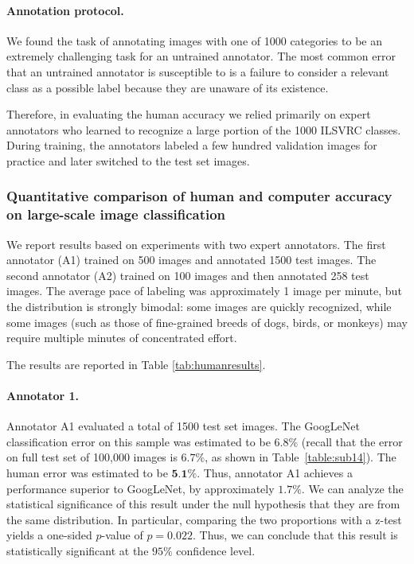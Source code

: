 \paragraph{Annotation protocol.} We found the task of annotating images with one of 1000 categories to be an extremely challenging task for an untrained annotator. The most common error that an untrained annotator is susceptible to is a failure to consider a relevant class as a possible label because they are unaware of its existence. 


Therefore, in evaluating the human accuracy we relied primarily on expert annotators who learned to recognize a large portion of the 1000 ILSVRC classes. During training, the annotators labeled a few hundred validation images for practice and later switched to the test set images.




\subsubsection{Quantitative comparison of human and computer accuracy on large-scale image classification}

We report results based on experiments with two expert annotators. The first annotator (A1) trained on 500 images and annotated 1500 test images. The second annotator (A2) trained on 100 images and then annotated 258 test images. The average pace of labeling was approximately 1 image per minute, but the distribution is strongly bimodal: some images are quickly recognized, while some images (such as those of fine-grained breeds of dogs, birds, or monkeys) may require multiple minutes of concentrated effort.

The results are reported in Table \ref{tab:humanresults}. 

\paragraph{Annotator 1.} Annotator A1 evaluated a total of 1500 test set images. The GoogLeNet classification error on this sample was estimated to be $6.8\%$ (recall that the error on full test set of 100,000 images is $6.7\%$, as shown in Table~\ref{table:sub14}). The human error was estimated to be $\textbf{5.1\%}$. Thus, annotator A1 achieves a performance superior to GoogLeNet, by approximately $1.7\%$. We can analyze the statistical significance of this result under the null hypothesis that they are from the same distribution. In particular, comparing the two proportions with a z-test yields a one-sided $p$-value of $p = 0.022$. Thus, we can conclude that this result is statistically significant at the $95\%$ confidence level. 

